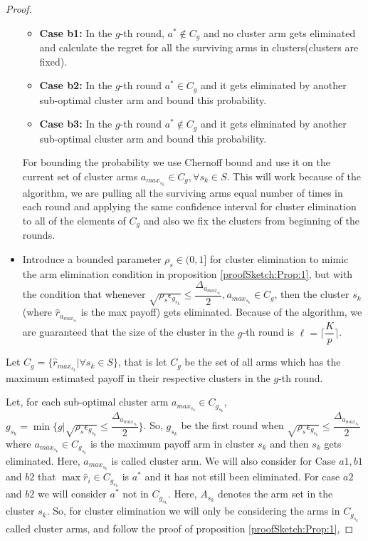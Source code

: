 \begin{proof}
\begin{itemize}
\begin{itemize}
\item \textbf{Case b1:} In the $g$-th round, $a^{*}\notin C_{g}$ and no cluster arm gets eliminated and calculate the regret for all the surviving arms in clusters(clusters are fixed).
\item \textbf{Case b2:} In the $g$-th round $a^{*}\in C_{g}$ and it gets eliminated by another sub-optimal cluster arm and bound this probability.
\item \textbf{Case b3:} In the $g$-th round $a^{*}\notin C_{g}$ and it gets eliminated by another sub-optimal cluster arm  and bound this probability.
\end{itemize}
For bounding the probability we use Chernoff bound and use it on the current set of cluster arms $a_{max_{s_{k}}}\in C_{g},\forall s_{k}\in S$. This will work because of the algorithm, we are pulling all the  surviving arms equal number of times in each round and applying the same confidence interval for cluster elimination to all of the elements of $C_{g}$ and also we fix the clusters from beginning of the rounds.
\item Introduce a bounded parameter $\rho_{s}\in (0,1]$ for cluster elimination to mimic the arm elimination condition in proposition \ref{proofSketch:Prop:1}, but with the condition that whenever $\sqrt{\rho_{s}\epsilon_{g_{s_{k}}}}\leq \dfrac{\Delta_{a_{max_{s_{k}}}}}{2}, a_{max_{s_{k}}}\in C_{g}$, then the cluster $s_{k}$(where $\hat{r}_{a_{max_{s_{k}}}}$ is the max payoff) gets eliminated. Because of the algorithm, we are guaranteed that the size of the cluster in the $g$-th round is $\ell=\bigg\lceil \dfrac{K}{p}\bigg\rceil$.
\end{itemize}

Let $C_{g}=\lbrace \hat{r}_{max_{s_{k}}}| \forall s_{k}\in S \rbrace$, that is let $C_{g}$ be the set of all arms which has the maximum estimated payoff in their respective clusters in the $g$-th round.

Let, for each sub-optimal cluster arm $a_{max_{s_{k}}}\in C_{g_{s_{k}}}$, $g_{s_{k}}=\min{\lbrace g|\sqrt{\rho_{s}\epsilon_{g_{s_{k}}}}\leq \dfrac{\Delta_{a_{max_{s_{k}}}}}{2} \rbrace}$. So, $g_{s_{k}}$ be the first round when $\sqrt{\rho_{s}\epsilon_{g_{s_{k}}}}\leq \dfrac{\Delta_{a_{max_{s_{k}}}}}{2}$ where $a_{max_{s_{k}}}\in C_{g_{s_{k}}}$ is the maximum payoff arm in cluster $s_{k}$ and then $s_{k}$ gets eliminated. Here, $a_{max_{s_{k}}}$ is called cluster arm. We will also consider for Case $a1,b1 $ and $b2$  that $\max \hat{r}_{i}\in C_{g_{s_{k}}}$ is $a^{*}$ and it has not still been eliminated. For case $a2$ and $b2$ we will consider $a^{*}$ not in $C_{g_{s_{k}}}$. Here, $A_{{s_{k}}}$ denotes the arm set in the cluster $s_{k}$. So, for cluster elimination we will only be considering the arms in $C_{g_{s_{k}}}$ called cluster arms, and follow the proof of proposition \ref{proofSketch:Prop:1},


\end{proof}
